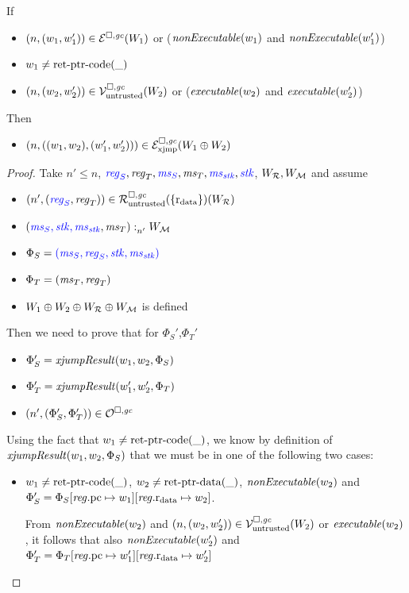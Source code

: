 \documentclass[a4paper]{article}
\begin{document}
\begin{lemma}
  \label{lem:lre-implies-lrexj}
  If
  \begin{itemize}
  \item $\npair{(w_1,w_1')} \in \lre(W_1)$ or ($\nonExec{w_1}$ and $\nonExec{w_1'}$)
  \item $w_1 \neq \retptrc(\_)$
  \item $\npair{(w_2,w_2')} \in \lrv(W_2)$ or ($\exec{w_2}$ and $\exec{w_2'}$)
  \end{itemize}
  Then
  \begin{itemize}
  \item $\npair{((w_1,w_2),(w_1',w_2'))} \in \lrexj(W_1 \oplus W_2)$
  \end{itemize}
\end{lemma}
\begin{proof}
  Take $n' \leq n$, $\src{\reg_S}, \reg_T, \src{\ms_S}, \ms_T, \src{\ms_\stk}, \src{\stk}$, $W_\lrrs , W_\lrm$ and assume
  \begin{itemize}
  \item $\npair[n']{\stpair{\reg}{\reg}} \in \lrr(\{\rdata\}) (W_\lrrs )$
  \item $\memSat[n']{\stpair[.]{\ms_S,\stk,\ms_\stk}{\ms_T}}{W_\lrm}$
  \item $\Phi_S = \src{(\ms_S,\reg_S,\stk, \ms_\stk)}$
  \item $\Phi_T = (\ms_T,\reg_T)$
  \item $W_1 \oplus W_2 \oplus W_\lrrs \oplus W_\lrm$ is defined 
  \end{itemize}
  Then we need to prove that for $\Phi_S'$,$\Phi_T'$
  \begin{itemize}
  \item $\Phi_S' = \xjumpResult{w_1}{w_2}{\Phi_S}$
  \item $\Phi_T' = \xjumpResult{w_1'}{w_2'}{\Phi_T}$
  \item $\npair[n']{\left(\Phi_S', \Phi_T' \right)}\in \lro$
  \end{itemize}

  Using the fact that $w_1 \neq \retptrc(\_)$, we know by definition of $\xjumpResult{w_1}{w_2}{\Phi_S}$ that we must be in one of the following two cases:
  \begin{itemize}
  \item $w_1 \neq \retptrc(\_)$, $w_2 \neq \retptrd(\_)$, $\nonExec{w_2}$ and
    $\Phi_S' = \Phi_S \updReg{\pcreg}{w_1}\updReg{\rdata}{w_2}$.

    From $\nonExec{w_2}$ and $\npair{(w_2,w_2')} \in \lrv(W_2)$ or $\exec{w_2}$, it follows that also $\nonExec{w_2'}$ and $\Phi_T' = \Phi_T \updReg{\pcreg}{w_1'}\updReg{\rdata}{w_2'}$


\end{itemize}
\end{proof}
\end{document}
